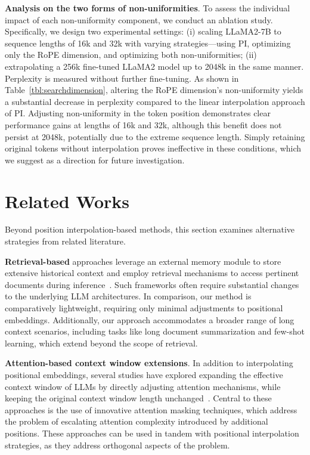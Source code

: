 \textbf{Analysis on the two forms of non-uniformities}. To assess the individual impact of each non-uniformity component, we conduct an ablation study. Specifically, we design two experimental settings: (i) scaling LLaMA2-7B to sequence lengths of 16k and 32k with varying strategies—using PI, optimizing only the RoPE dimension, and optimizing both non-uniformities; (ii) extrapolating a 256k fine-tuned LLaMA2 model up to 2048k in the same manner. Perplexity is measured without further fine-tuning. As shown in Table~\ref{tbl:searchdimension}, altering the RoPE dimension's non-uniformity yields a substantial decrease in perplexity compared to the linear interpolation approach of PI. Adjusting non-uniformity in the token position demonstrates clear performance gains at lengths of 16k and 32k, although this benefit does not persist at 2048k, potentially due to the extreme sequence length. Simply retaining original tokens without interpolation proves ineffective in these conditions, which we suggest as a direction for future investigation.

\section{Related Works}

Beyond position interpolation-based methods, this section examines alternative strategies from related literature.

\textbf{Retrieval-based} approaches leverage an external memory module to store extensive historical context and employ retrieval mechanisms to access pertinent documents during inference~\cite{longllama,wang2023augmenting,borgeaud2022improving}. Such frameworks often require substantial changes to the underlying LLM architectures. In comparison, our method is comparatively lightweight, requiring only minimal adjustments to positional embeddings. Additionally, our approach accommodates a broader range of long context scenarios, including tasks like long document summarization and few-shot learning, which extend beyond the scope of retrieval.

\textbf{Attention-based context window extensions}. In addition to interpolating positional embeddings, several studies have explored expanding the effective context window of LLMs by directly adjusting attention mechanisms, while keeping the original context window length unchanged~\cite{han2023lminfinite, streamingllm,parallelwindow}. Central to these approaches is the use of innovative attention masking techniques, which address the problem of escalating attention complexity introduced by additional positions. These approaches can be used in tandem with positional interpolation strategies, as they address orthogonal aspects of the problem.

